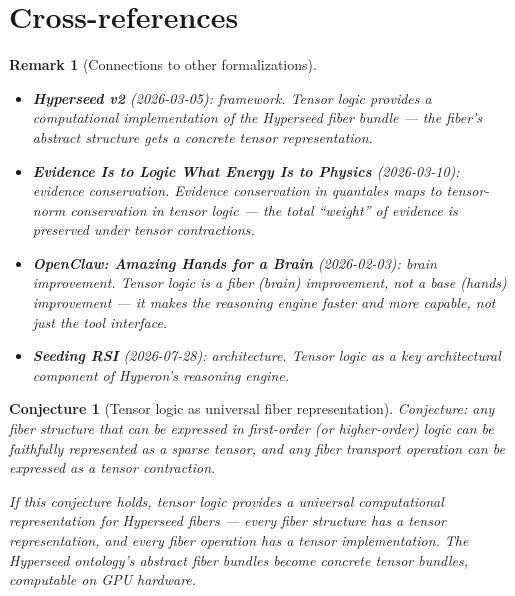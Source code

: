 \documentclass[11pt,a4paper]{article}
\newtheorem{remark}[definition]{Remark}
\newtheorem{conjecture}[definition]{Conjecture}
\begin{document}
\section{Cross-references}

\begin{remark}[Connections to other formalizations]
\begin{itemize}
\item \textbf{Hyperseed v2} (2026-03-05): framework. Tensor logic
  provides a computational implementation of the Hyperseed fiber
  bundle --- the fiber's abstract structure gets a concrete tensor
  representation.
\item \textbf{Evidence Is to Logic What Energy Is to Physics} (2026-03-10):
  evidence conservation. Evidence conservation in quantales maps to
  tensor-norm conservation in tensor logic --- the total ``weight''
  of evidence is preserved under tensor contractions.
\item \textbf{OpenClaw: Amazing Hands for a Brain} (2026-02-03):
  brain improvement. Tensor logic is a fiber (brain) improvement,
  not a base (hands) improvement --- it makes the reasoning engine
  faster and more capable, not just the tool interface.
\item \textbf{Seeding RSI} (2026-07-28): architecture. Tensor logic
  as a key architectural component of Hyperon's reasoning engine.
\end{itemize}
\end{remark}

\begin{conjecture}[Tensor logic as universal fiber representation]
Conjecture: any fiber structure that can be expressed in first-order
(or higher-order) logic can be faithfully represented as a sparse
tensor, and any fiber transport operation can be expressed as a
tensor contraction.

If this conjecture holds, tensor logic provides a \emph{universal}
computational representation for Hyperseed fibers --- every fiber
structure has a tensor representation, and every fiber operation has
a tensor implementation. The Hyperseed ontology's abstract fiber
bundles become concrete tensor bundles, computable on GPU hardware.
\end{conjecture}
\end{document}
